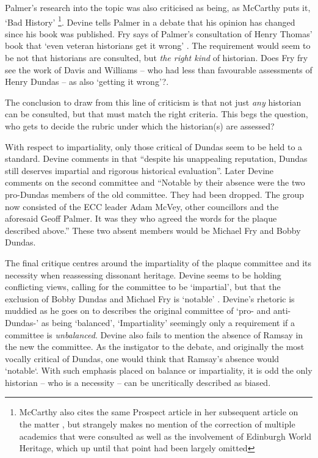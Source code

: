 \documentclass{scrartcl}
\renewcommand{\cite}{\parencite}
\begin{document}

Palmer's research into the topic was also criticised as being, as McCarthy puts it, `Bad History' \cite[][]{mccarthy_2022_1} \footnote{McCarthy also cites the same Prospect article \cite[][]{lloyd_2022} in her subsequent article on the matter \cite[][]{mccarthy_2022_2}, but strangely makes no mention of the correction of multiple academics that were consulted as well as the involvement of Edinburgh World Heritage, which up until that point had been largely omitted}. Devine tells Palmer in a debate that his opinion has changed \cite[][]{mackay_2021} since his book \cite[][]{devine_2015} was published. Fry says of Palmer's consultation of Henry Thomas' book \cite[][]{thomas_1997} that `even veteran historians get it wrong' \cite[][]{fry_2020}. The requirement would seem to be not that historians are consulted, but \textit{the right kind} of historian. Does Fry fry see the work of Davis \cite[][]{davis_1975} and Williams \cite[][]{williams_1938} -- who had less than favourable assessments of Henry Dundas -- as also `getting it wrong'?. 

The conclusion to draw from this line of criticism is that not just \textit{any} historian can be consulted, but that must match the right criteria. This begs the question, who gets to decide the rubric under which the historian(s) are assessed?


With respect to impartiality, only those critical of Dundas seem to be held to a standard. Devine comments in \cite[][]{devine_2020} that ``despite his unappealing reputation, Dundas still deserves impartial and rigorous historical evaluation''. Later Devine comments on the second committee and ``Notable by their absence were the two pro-Dundas members of the old committee. They had been dropped. The group now consisted of the ECC leader Adam McVey, other councillors and the aforesaid Geoff Palmer. It was they who agreed the words for the plaque described above.'' These two absent members would be Michael Fry and Bobby Dundas.

The final critique centres around the impartiality of the plaque committee and its necessity when reassessing dissonant heritage.
Devine seems to be holding conflicting views, calling for the committee to be `impartial', but that the exclusion of Bobby Dundas and Michael Fry is `notable' \cite[][]{devine_2020}. Devine's rhetoric is muddied as he goes on to describes the original committee of `pro- and anti-Dundas-' as being `balanced', `Impartiality' seemingly only a requirement if a committee is \textit{unbalanced}. Devine also fails to mention the absence of Ramsay in the new the committee. As the instigator to the debate, and originally the most vocally critical of  Dundas, one would think that Ramsay's absence would `notable`. With such emphasis placed on balance or impartiality, it is odd the only historian -- who is a necessity -- can be uncritically described as biased.
\end{document}
